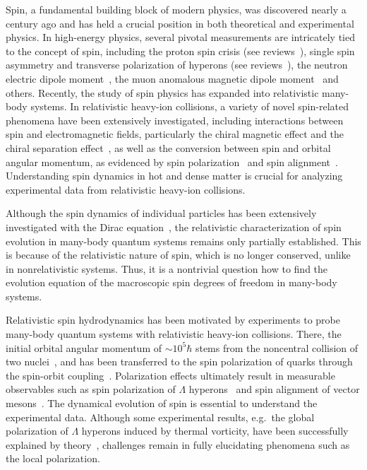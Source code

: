 \documentclass[prl,superscriptaddress,twocolumn,
  showpacs,preprintnumbers,amsmath,amssymb]{revtex4-1}
\begin{document}
Spin, a fundamental building block of modern physics, was discovered nearly a century ago and has held a crucial position in both theoretical and experimental physics.  In high-energy physics, several pivotal measurements are intricately tied to the concept of spin, including the proton spin crisis (see reviews~\cite{Leader:2013jra,Deur:2018roz,Ji:2020ena}), single spin asymmetry and transverse polarization of hyperons (see reviews~\cite{DAlesio:2007bjf,Aidala:2012mv}), the neutron electric dipole moment~\cite{Abel:2020pzs}, the muon anomalous magnetic dipole moment~\cite{Muong-2:2021ojo} and others.
Recently, the study of spin physics has expanded into relativistic many-body systems. In relativistic heavy-ion collisions, a variety of novel spin-related phenomena have been extensively investigated, including interactions between spin and electromagnetic fields, particularly the chiral magnetic effect and the chiral separation effect~\cite{Kharzeev:2007jp,Fukushima:2008xe,Kharzeev:2015znc}, as well as the conversion between spin and orbital angular momentum, as evidenced by spin polarization~\cite{Liang:2004ph,STAR:2017ckg} and spin alignment~\cite{Liang:2004xn,STAR:2022fan}.  Understanding spin dynamics in hot and dense matter is crucial for analyzing experimental data from relativistic heavy-ion collisions.

Although the spin dynamics of individual particles has been extensively investigated with the Dirac equation~\cite{Leader_2001}, the relativistic characterization of spin evolution in many-body quantum systems remains only partially established.  This is because of the relativistic nature of spin, which is no longer conserved, unlike in nonrelativistic systems.
Thus, it is a nontrivial question how to find the evolution equation of the macroscopic spin degrees of freedom in many-body systems.

Relativistic spin hydrodynamics has been motivated by experiments to probe many-body quantum systems with relativistic heavy-ion collisions.  There, the initial orbital angular momentum of $\sim 10^5\hbar$ stems from the noncentral collision of two nuclei~\cite{Jiang:2016woz}, and has been transferred to the spin polarization of quarks through the spin-orbit coupling~\cite{Liang:2004ph}.  Polarization effects ultimately result in measurable observables such as spin polarization of $\Lambda$ hyperons~\cite{STAR:2017ckg,STAR:2019erd} and spin alignment of vector mesons~\cite{STAR:2022fan,ALICE:2022dyy}.
The dynamical evolution of spin is essential to understand the experimental data.  Although some experimental results, e.g.\ the global polarization of $\Lambda$ hyperons induced by thermal vorticity, have been successfully explained by theory~\cite{Becattini:2013fla}, challenges remain in fully elucidating phenomena such as the local polarization.
\end{document}
